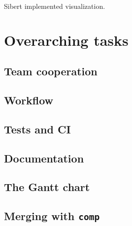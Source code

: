 \documentclass[a4paper,12pt]{article}
\begin{document}
Sibert implemented visualization.

\section{Overarching tasks}
\subsection{Team cooperation} %
\subsection{Workflow} %
\subsection{Tests and CI} %
\subsection{Documentation}
\subsection{The Gantt chart}
\subsection{Merging with \texttt{comp}}

\pagebreak
\printbibliography
\end{document}
